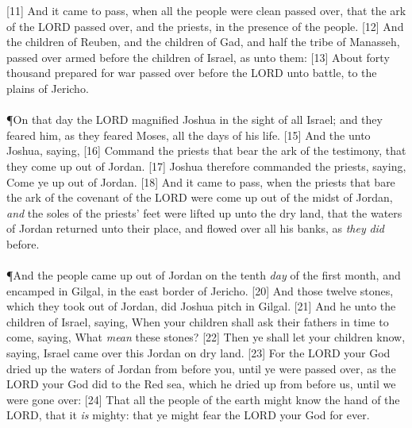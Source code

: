 [11] \textcolor[cmyk]{0.99998,1,0,0}{And it came to pass, when all the people were clean passed over, that the ark of the LORD passed over, and the priests, in the presence of the people.}
[12] \textcolor[cmyk]{0.99998,1,0,0}{And the children of Reuben, and the children of Gad, and half the tribe of Manasseh, passed over armed before the children of Israel, as  unto them:}
[13] \textcolor[cmyk]{0.99998,1,0,0}{About forty thousand prepared for war passed over before the LORD unto battle, to the plains of Jericho.}\\
\\
\P \textcolor[cmyk]{0.99998,1,0,0}{On that day the LORD magnified Joshua in the sight of all Israel; and they feared him, as they feared Moses, all the days of his life.}
[15] \textcolor[cmyk]{0.99998,1,0,0}{And the  unto Joshua, saying,}
[16] \textcolor[cmyk]{0.99998,1,0,0}{Command the priests that bear the ark of the testimony, that they come up out of Jordan.}
[17] \textcolor[cmyk]{0.99998,1,0,0}{Joshua therefore commanded the priests, saying, Come ye up out of Jordan.}
[18] \textcolor[cmyk]{0.99998,1,0,0}{And it came to pass, when the priests that bare the ark of the covenant of the LORD were come up out of the midst of Jordan, \emph{and} the soles of the priests' feet were lifted up unto the dry land, that the waters of Jordan returned unto their place, and flowed over all his banks, as \emph{they} \emph{did} before.}\\
\\
\P \textcolor[cmyk]{0.99998,1,0,0}{And the people came up out of Jordan on the tenth \emph{day} of the first month, and encamped in Gilgal, in the east border of Jericho.}
[20] \textcolor[cmyk]{0.99998,1,0,0}{And those twelve stones, which they took out of Jordan, did Joshua pitch in Gilgal.}
[21] \textcolor[cmyk]{0.99998,1,0,0}{And he  unto the children of Israel, saying, When your children shall ask their fathers in time to come, saying, What \emph{mean} these stones?}
[22] \textcolor[cmyk]{0.99998,1,0,0}{Then ye shall let your children know, saying, Israel came over this Jordan on dry land.}
[23] \textcolor[cmyk]{0.99998,1,0,0}{For the LORD your God dried up the waters of Jordan from before you, until ye were passed over, as the LORD your God did to the Red sea, which he dried up from before us, until we were gone over:}
[24] \textcolor[cmyk]{0.99998,1,0,0}{That all the people of the earth might know the hand of the LORD, that it \emph{is} mighty: that ye might fear the LORD your God for ever.}